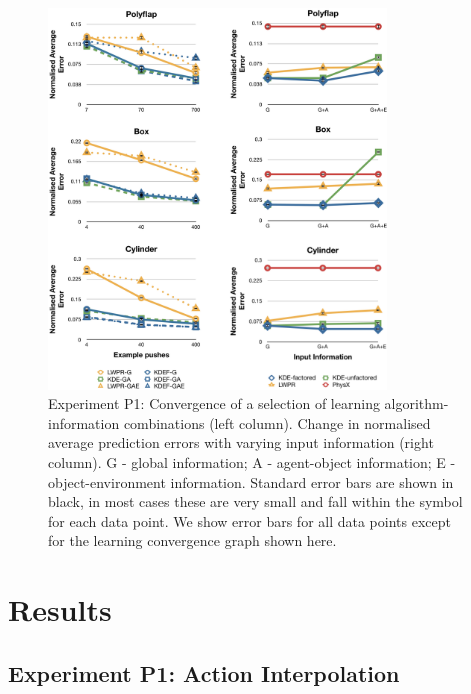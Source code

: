 \begin{figure}[t]
\centerline{
\includegraphics[width=0.8\textwidth]{./P1-graphs}
}
\vspace{-1mm}
\caption{Experiment P1: Convergence of a selection of learning
  algorithm-information combinations (left column). Change in normalised average prediction errors with varying input information (right column). G - global information; A - agent-object information; E - object-environment information. Standard error bars are shown in black, in most cases these are very small and fall within the symbol for each data point. We show error bars for all data points except for the learning convergence graph shown here.}
\label{fig:Lgraphs}
\end{figure}


\section{Results}\label{sec:Results}

\subsection{Experiment P1: Action Interpolation}\label{sec:Results.Learning}

